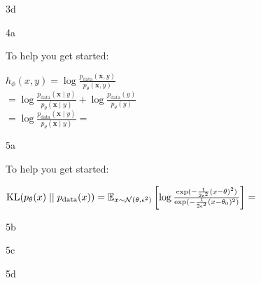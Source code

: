 \LARGE
3d
\normalsize
\begin{answer}
\end{answer}

\clearpage

\LARGE
4a
\normalsize
\begin{answer}
    To help you get started:
    
    \begin{center}
        $h_{\phi}(x,y) = \log \frac{p_{\text{data}}(\bm{x},y)}{p_{\theta}(\bm{x}, y)}$ \\
        $ = \log \frac{p_{\text{data}}(\bm{x} \mid y)}{p_{\theta}(\bm{x} \mid y)} + \log \frac{p_{\text{data}}(y)}{p_{\theta}(y)}$ \\
        $ = \log \frac{p_{\text{data}}(\bm{x} \mid y)}{p_{\theta}(\bm{x} \mid y)} = $ \\
    \end{center}

\end{answer}

\clearpage

\LARGE
5a
\normalsize
\begin{answer}
    To help you get started: 
    \begin{center}
        $\text{KL}(p_{\theta}(x) \mid\mid p_{\text{data}}(x)) = \mathbb{E}_{x \sim \mathcal{N}(\theta, \epsilon^2)}\left[ \log \frac{\exp(- \frac{1}{2\epsilon^2}(x-\theta)^2)}{\exp(- \frac{1}{2\epsilon^2}(x - \theta_0)^2)}\right] = $ \\
    \end{center}

\end{answer}


\LARGE
5b
\normalsize
\begin{answer}
\end{answer}

\LARGE
5c
\normalsize
\begin{answer}
\end{answer}

\LARGE
5d
\normalsize
\begin{answer}
\end{answer}


